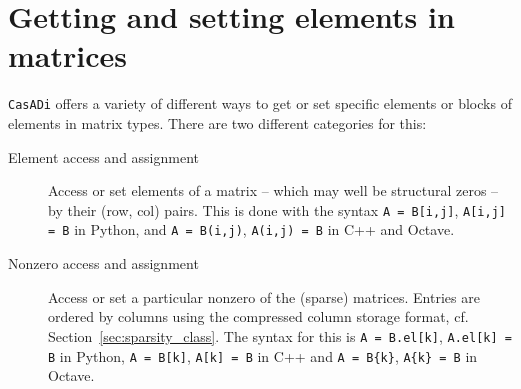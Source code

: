 \documentclass[a4paper,12pt]{book}
\newcommand{\CasADi}{\texttt{CasADi}\xspace}
\begin{document}

\section{Getting and setting elements in matrices} \label{sec:getset}
\CasADi offers a variety of different ways to get or set specific elements or blocks of elements in matrix types. There are two different categories for this:

\begin{description}
\item[Element access and assignment] Access or set elements of a matrix -- which may well be structural zeros --  by their (row, col) pairs. This is done with the syntax \verb|A = B[i,j]|, \verb|A[i,j] = B| in Python, and \verb|A = B(i,j)|, \verb|A(i,j) = B| in C++ and Octave.
\item[Nonzero access and assignment] Access or set a particular nonzero of the (sparse) matrices. Entries are ordered by columns using the compressed column storage format, cf. Section~\ref{sec:sparsity_class}. The syntax for this is \verb|A = B.el[k]|, \verb|A.el[k] = B| in Python, \verb|A = B[k]|, \verb|A[k] = B| in C++ and \verb|A = B{k}|, \verb|A{k} = B| in Octave.
\end{description}
\end{document}

